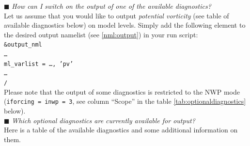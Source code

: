 $\blacksquare$ \emph{How can I switch on the output of one of the available diagnostics?} \\

Let us assume that you would like to output \emph{potential vorticity}
(see table of available diagnostics below) on model levels.
Simply add the following element to the desired output namelist (see \ref{nml:output}) in your run script: \\
\texttt{\&output\_nml}\\
\texttt{\ldots}\\
\texttt{ml\_varlist = \ldots, 'pv'} \\
\texttt{\ldots}\\
\texttt{/}\\
%
Please note that the output of some diagnostics is restricted to the NWP mode
(\texttt{iforcing = inwp = 3}, see column ``Scope'' in the table \ref{tab:optionaldiagnostics} below).\\

$\blacksquare$ \emph{Which optional diagnostics are currently available for output?} \\

Here is a table of the available diagnostics and some additional information on them.

